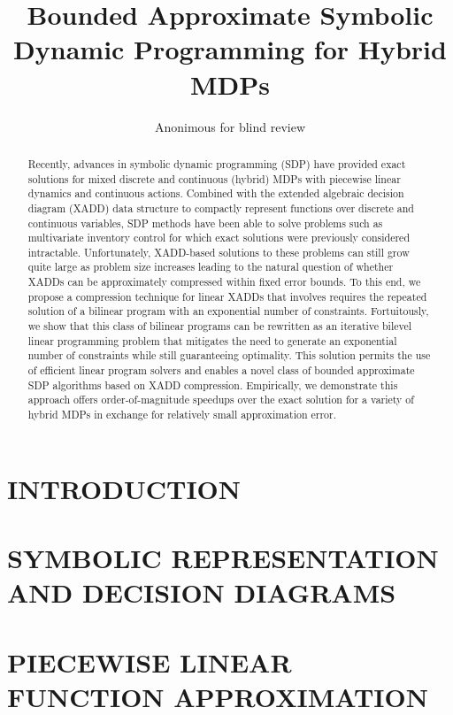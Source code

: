 \documentclass[]{article}
\title{	Bounded Approximate Symbolic Dynamic Programming for Hybrid MDPs }
\author{Anonimous for blind review}
\begin{document}
\maketitle

\begin{abstract}
Recently, advances in symbolic dynamic programming (SDP) have provided exact solutions for mixed discrete and continuous (hybrid) MDPs with piecewise linear dynamics and continuous actions. Combined with the extended algebraic decision diagram (XADD) data structure to compactly represent functions over discrete and continuous variables, SDP methods have been able to solve problems such as multivariate inventory control for which exact solutions were previously considered intractable. Unfortunately, XADD-based solutions to these problems can still grow quite large as problem size increases leading to the natural question of whether XADDs can be approximately compressed within fixed error bounds. To this end, we propose a compression technique for linear XADDs that involves requires the repeated solution of a bilinear program with an exponential number of constraints. Fortuitously, we show that this class of bilinear programs can be rewritten as an iterative bilevel linear programming problem that mitigates the need to generate an exponential number of constraints while still guaranteeing optimality. This solution permits the use of efficient linear program solvers and enables a novel class of bounded approximate SDP algorithms based on XADD compression. Empirically, we demonstrate this approach offers order-of-magnitude speedups over the exact solution for a variety of hybrid MDPs in exchange for relatively small approximation error.
\end{abstract}

\section{INTRODUCTION}



\section{SYMBOLIC REPRESENTATION AND DECISION DIAGRAMS}



\section{PIECEWISE LINEAR FUNCTION APPROXIMATION}
\end{document}
